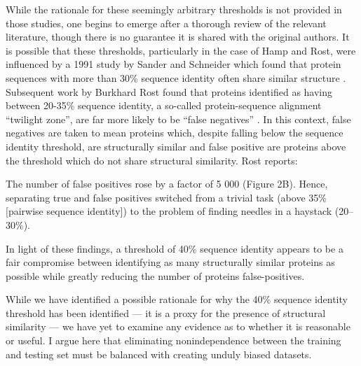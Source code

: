 While the rationale for these seemingly arbitrary thresholds is not provided in those studies, one begins to emerge after a thorough review of the relevant literature, though there is no guarantee it is shared with the original authors. It is possible that these thresholds, particularly in the case of Hamp and Rost, were influenced by a 1991 study by Sander and Schneider which found that protein sequences with more than 30\% sequence identity often share similar structure \cite{Sander_Schneider_1991}. Subsequent work by Burkhard Rost found that proteins identified as having between 20-35\% sequence identity, a so-called protein-sequence alignment ``twilight zone'', are far more likely to be ``false negatives'' \cite{rost_twilight_zone}. In this context, false negatives are taken to mean proteins which, despite falling below the sequence identity threshold, are structurally similar and false positive are proteins above the threshold which do not share structural similarity. Rost reports:

\begin{displayquote}
\begin{singlespace}
The number of false positives rose by a factor of 5 000 (Figure 2B). Hence, separating true and false positives switched from a trivial task (above 35\% [pairwise sequence identity]) to the problem of finding needles in a haystack (20–30\%). \cite{rost_twilight_zone}
\end{singlespace}
\end{displayquote}

In light of these findings, a threshold of 40\% sequence identity appears to be a fair compromise between identifying as many structurally similar proteins as possible while greatly reducing the number of proteins false-positives.

While we have identified a possible rationale for why the 40\% sequence identity threshold has been identified --- it is a proxy for the presence of structural similarity --- we have yet to examine any evidence as to whether it is reasonable or useful. I argue here that eliminating nonindependence between the training and testing set must be balanced with creating unduly biased datasets.

